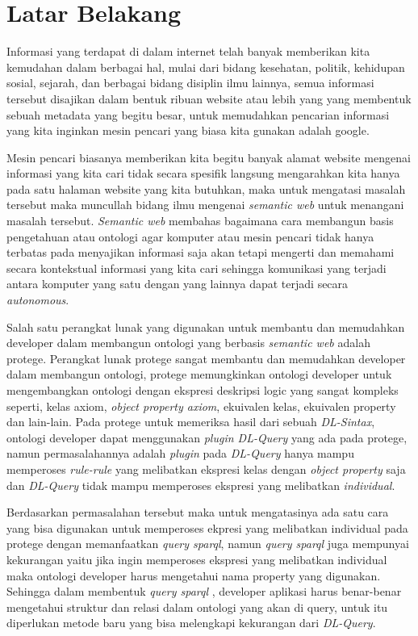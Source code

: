 \section{Latar Belakang}

Informasi yang terdapat di dalam internet telah banyak memberikan kita kemudahan dalam berbagai hal, mulai dari bidang kesehatan, politik, kehidupan sosial, sejarah, dan berbagai bidang disiplin ilmu lainnya, semua informasi tersebut disajikan dalam bentuk ribuan website atau lebih yang yang membentuk sebuah metadata yang begitu besar, untuk memudahkan pencarian informasi yang kita inginkan mesin pencari yang biasa kita gunakan adalah google.

Mesin pencari biasanya memberikan kita begitu banyak alamat website mengenai informasi yang kita cari tidak secara spesifik langsung mengarahkan kita hanya pada satu halaman website yang kita butuhkan, maka untuk mengatasi masalah tersebut maka muncullah bidang ilmu mengenai \emph{semantic web} untuk menangani masalah tersebut. \emph{Semantic web} membahas bagaimana cara membangun basis pengetahuan atau ontologi agar komputer atau mesin pencari tidak hanya terbatas pada menyajikan informasi saja akan tetapi mengerti dan memahami secara kontekstual informasi yang kita cari sehingga komunikasi yang terjadi antara komputer yang satu dengan yang lainnya dapat terjadi secara \emph{autonomous}. 

Salah satu perangkat lunak yang digunakan untuk membantu dan memudahkan developer dalam membangun ontologi yang berbasis \emph{semantic web} adalah protege. Perangkat lunak protege sangat membantu dan memudahkan developer dalam membangun ontologi, protege memungkinkan ontologi developer untuk mengembangkan ontologi dengan ekspresi deskripsi logic yang sangat kompleks seperti, kelas axiom, \emph{object property axiom}, ekuivalen kelas, ekuivalen property dan lain-lain. Pada protege untuk memeriksa hasil dari sebuah \emph{DL-Sintax}, ontologi developer dapat menggunakan \emph{plugin DL-Query} yang ada pada protege, namun permasalahannya adalah \emph{plugin} pada \emph{DL-Query} hanya mampu memperoses \emph{rule-rule} yang melibatkan ekspresi kelas dengan \emph{object property} saja dan \emph{DL-Query}  tidak mampu memperoses ekspresi yang melibatkan \emph{individual}.

Berdasarkan permasalahan tersebut maka untuk mengatasinya ada satu cara yang bisa digunakan untuk memperoses ekpresi yang melibatkan individual pada protege dengan memanfaatkan \emph{query sparql}, namun \emph{query sparql} juga mempunyai kekurangan yaitu jika ingin memperoses ekspresi yang melibatkan individual maka ontologi developer harus mengetahui nama property yang digunakan. Sehingga dalam membentuk \emph{query sparql} , developer aplikasi harus benar-benar mengetahui struktur dan relasi dalam ontologi yang akan di query, untuk itu diperlukan metode baru yang bisa melengkapi kekurangan dari \emph{DL-Query}.


